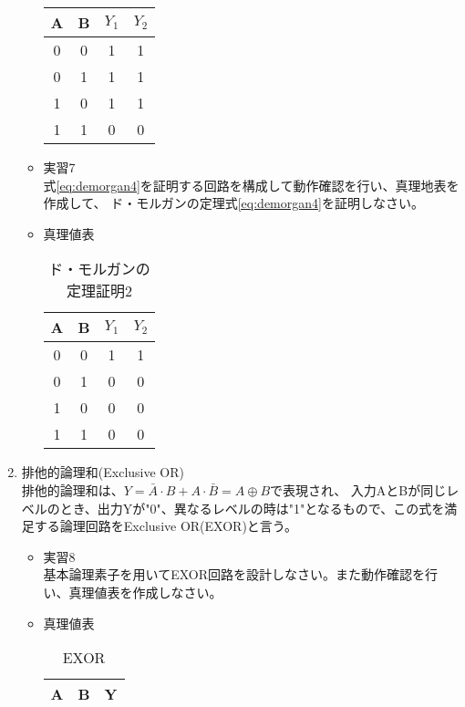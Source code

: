 \documentclass[dvipdfmx]{jsarticle}
\begin{document}
\begin{enumerate}
\begin{itemize}
\begin{table}[H]
\begin{tabular}{|c|c|c|c|}
											\hline
											A & B & $Y_1$ &$Y_2$ \\ \hline
											0 & 0 & 1 & 1 \\ \hline
											0 & 1 & 1 & 1\\ \hline
											1 & 0 & 1 & 1\\ \hline
											1 & 1 & 0 & 0\\ \hline
										\end{tabular}
									\end{table}
								\item 実習7 \\
									式\ref{eq:demorgan4}を証明する回路を構成して動作確認を行い、真理地表を作成して、
									ド・モルガンの定理式\ref{eq:demorgan4}を証明しなさい。
								\item 真理値表
									\begin{table}[H]
										\center
										\caption{ド・モルガンの定理証明2 \label{tb:demorgan2}}
										\begin{tabular}{|c|c|c|c|}
											\hline
											A & B & $Y_1$ &$Y_2$ \\ \hline
											0 & 0 & 1 & 1 \\ \hline
											0 & 1 & 0 & 0\\ \hline
											1 & 0 & 0 & 0\\ \hline
											1 & 1 & 0 & 0\\ \hline
										\end{tabular}
									\end{table}
							\end{itemize}
						\item 排他的論理和(Exclusive OR) \\
							排他的論理和は、$Y = \bar{A} \cdot B + A \cdot \bar{B} = A \oplus B$で表現され、
							入力AとBが同じレベルのとき、出力Yが"0"、異なるレベルの時は"1"となるもので、この式を満足する論理回路をExclusive OR(EXOR)と言う。
							\begin{itemize}
								\item 実習8\\
									基本論理素子を用いてEXOR回路を設計しなさい。また動作確認を行い、真理値表を作成しなさい。
								\item 真理値表
									\begin{table}[H]
										\center
										\caption{EXOR \label{tb:exor}}
										\begin{tabular}{|c|c|c|}
											\hline
											A & B & Y\\ \hline

\end{tabular}
\end{table}
\end{itemize}
\end{enumerate}
\end{document}
